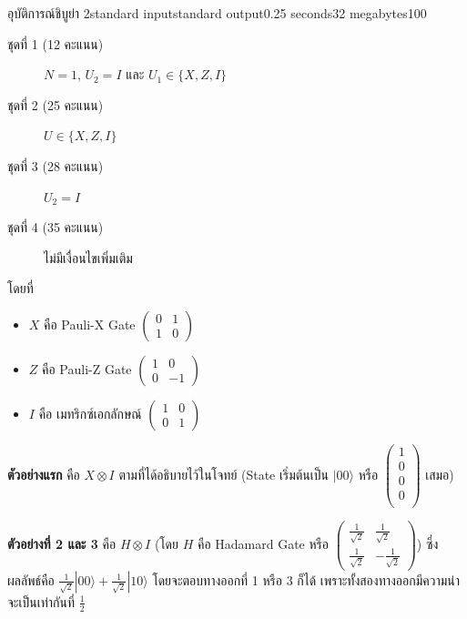 \documentclass[11pt,a4paper]{article}
\begin{document}
\begin{problem}{อุบัติการณ์ชิบูย่า 2}{standard input}{standard output}{0.25 seconds}{32 megabytes}{100}
\begin{description}
\item[ชุดที่ 1 (12 คะแนน)] $N = 1$, $U_2 = I$ และ $U_1 \in \{X,Z,I\}$

\item[ชุดที่ 2 (25 คะแนน)] $U \in \{X,Z,I\}$

\item[ชุดที่ 3 (28 คะแนน)] $U_2 = I$

\item[ชุดที่ 4 (35 คะแนน)] ไม่มีเงื่อนไขเพิ่มเติม

\end{description}

โดยที่
\begin{itemize}

\item $X$ คือ Pauli-X Gate $\begin{pmatrix}
0 & 1 \\
1 & 0
\end{pmatrix}$

\item $Z$ คือ Pauli-Z Gate $\begin{pmatrix}
1 & 0 \\
0 & -1
\end{pmatrix}$

\item $I$ คือ เมทริกซ์เอกลักษณ์ $\begin{pmatrix}
1 & 0 \\
0 & 1
\end{pmatrix}$

\end{itemize}

\Examples

\begin{example}
%
%
%
%
\end{example}

\Note

\textbf{ตัวอย่างแรก} คือ $X \otimes I$ ตามที่ได้อธิบายไว้ในโจทย์ (State เริ่มต้นเป็น $|00\rangle$ หรือ $\begin{pmatrix}
1 \\
0 \\
0 \\
0 \\
\end{pmatrix}$ เสมอ)

\textbf{ตัวอย่างที่ 2 และ 3} คือ $H \otimes I$ (โดย $H$ คือ Hadamard Gate หรือ $\begin{pmatrix}
\frac{1}{\sqrt{2}} & \frac{1}{\sqrt{2}} \\
\frac{1}{\sqrt{2}} & -\frac{1}{\sqrt{2}}
\end{pmatrix}$) ซึ่งผลลัพธ์คือ $\frac{1}{\sqrt{2}}|00\rangle + \frac{1}{\sqrt{2}}|10\rangle$ โดยจะตอบทางออกที่ 1 หรือ 3 ก็ได้ เพราะทั้งสองทางออกมีความน่าจะเป็นเท่ากันที่ $\frac{1}{2}$


\end{problem}
\end{document}
